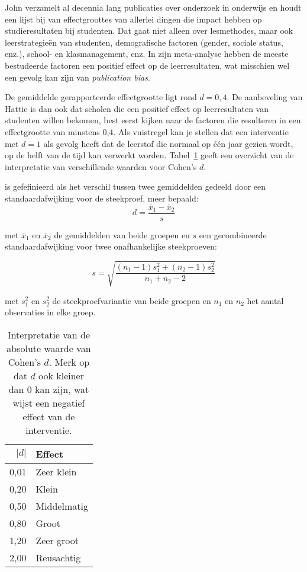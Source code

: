 John \textcite{Hattie2012} verzamelt al decennia lang publicaties over onderzoek in onderwijs en houdt een lijst bij van effectgroottes van allerlei dingen die impact hebben op studieresultaten bij studenten. Dat gaat niet alleen over lesmethodes, maar ook leerstrategieën van studenten, demografische factoren (gender, sociale status, enz.), school- en klasmanagement, enz. In zijn meta-analyse hebben de meeste bestudeerde factoren een positief effect op de leerresultaten, wat misschien wel een gevolg kan zijn van \emph{publication bias}. 

De gemiddelde gerapporteerde effectgrootte ligt rond $d = 0,4$. De aanbeveling van Hattie is dan ook dat scholen die een positief effect op leerresultaten van studenten willen bekomen, best eerst kijken naar de factoren die resulteren in een effectgrootte van minstens 0,4. Als vuistregel kan je stellen dat een interventie met $d = 1$ als gevolg heeft dat de leerstof die normaal op één jaar gezien wordt, op de helft van de tijd kan verwerkt worden. Tabel~\ref{table:effectgrootte} geeft een overzicht van de interpretatie van verschillende waarden voor Cohen's $d$.

\begin{definition}[Cohen's $d$]
  is gefefinieerd als het verschil tussen twee gemiddelden gedeeld door een standaardafwijking voor de steekproef, meer bepaald:
  \begin{equation}
  d = \frac{\overline{x}_1 - \overline{x}_2}{s}
  \end{equation}
  
  met $\overline{x}_1$ en $\overline{x}_2$ de gemiddelden van beide groepen en $s$ een gecombineerde standaardafwijking voor twee onafhankelijke steekproeven:
  
  \begin{equation}
  s = \sqrt{\frac{(n_1 - 1) s_1^2 + (n_2 - 1) s_2^2}{n_1 + n_2 - 2}}
  \end{equation}
  
  met $s_1^2$ en $s_2^2$ de steekproefvariantie van beide groepen en $n_1$ en $n_2$ het aantal observaties in elke groep.
\end{definition}

\begin{table}
  \centering
  \begin{tabular}{rl}
    \toprule
    \textbf{$|d|$} & \textbf{Effect} \\
    \midrule
    0,01 & Zeer klein \\
    0,20 & Klein \\
    0,50 & Middelmatig \\
    0,80 & Groot \\
    1,20 & Zeer groot \\
    2,00 & Reusachtig \\
    \bottomrule
  \end{tabular}
  \caption{Interpretatie van de absolute waarde van Cohen's $d$. Merk op dat $d$ ook kleiner dan 0 kan zijn, wat wijst een negatief effect van de interventie.}
  \label{table:effectgrootte}
\end{table}

